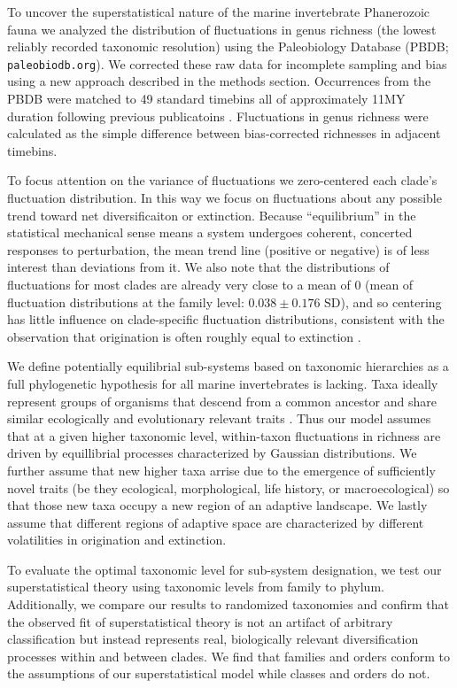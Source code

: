 \documentclass[12pt]{article}
\let\citep=\cite
\begin{document}
To uncover the superstatistical nature of the marine invertebrate
Phanerozoic fauna we analyzed the distribution of fluctuations in
genus richness (the lowest reliably recorded taxonomic resolution)
using the Paleobiology Database (PBDB; {\tt paleobiodb.org}). We
corrected these raw data for incomplete sampling and bias using a new
approach described in the methods section. Occurrences from the PBDB
were matched to 49 standard timebins all of approximately 11MY
duration following previous publicatoins \citep{alroy08,
  alroy2010}. Fluctuations in genus richness were calculated as the
simple difference between bias-corrected richnesses in adjacent
timebins.

To focus attention on the variance of fluctuations we zero-centered
each clade's fluctuation distribution. In this way we focus on
fluctuations about any possible trend toward net diversificaiton or
extinction. Because ``equilibrium'' in the statistical mechanical
sense means a system undergoes coherent, concerted responses to
perturbation, the mean trend line (positive or negative) is of less
interest than deviations from it. We also note that the distributions
of fluctuations for most clades are already very close to a mean of 0
(mean of fluctuation distributions at the family level:
$0.038 \pm 0.176 \text{ SD}$), and so centering has little influence
on clade-specific fluctuation distributions, consistent with the
observation that origination is often roughly equal to extinction
\citep{foote2010Chapter}.

We define potentially equilibrial sub-systems based on taxonomic
hierarchies as a full phylogenetic hypothesis for all marine
invertebrates is lacking.  Taxa ideally represent groups of organisms
that descend from a common ancestor and share similar ecologically and
evolutionary relevant traits \citep{mayr1965systZool, erwin2007,
  ezard2016}. Thus our model assumes that at a given higher taxonomic
level, within-taxon fluctuations in richness are driven by
equillibrial processes characterized by Gaussian distributions. We
further assume that new higher taxa arrise due to the emergence of
sufficiently novel traits (be they ecological, morphological, life history, or
macroecological) so that those new taxa occupy a new region of an
adaptive landscape. We lastly assume that different regions of
adaptive space are characterized by different volatilities in
origination and extinction.

To evaluate the optimal taxonomic level for sub-system designation, we
test our superstatistical theory using taxonomic levels from family to
phylum. Additionally, we compare our results to randomized taxonomies
and confirm that the observed fit of superstatistical theory is not an
artifact of arbitrary classification but instead represents real,
biologically relevant diversification processes within and between
clades. We find that families and orders conform to the assumptions of
our superstatistical model while classes and orders do not.
\end{document}
